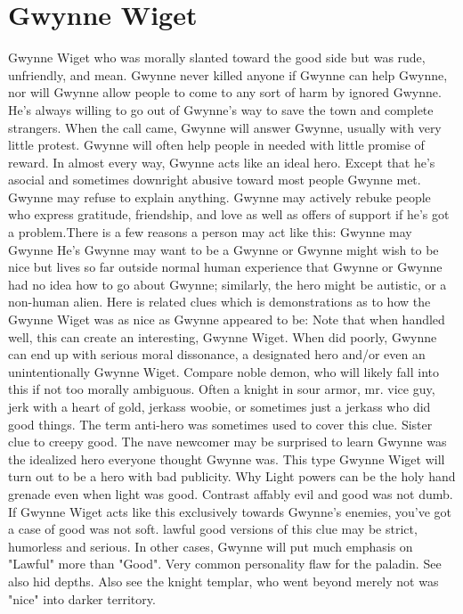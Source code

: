 \documentclass[12pt]{book}
\begin{document}
\chapter{Gwynne Wiget}

Gwynne Wiget who was morally slanted toward the good side but was rude, unfriendly, and mean. Gwynne never killed anyone if Gwynne can help Gwynne, nor will Gwynne allow people to come to any sort of harm by ignored Gwynne. He's always willing to go out of Gwynne's way to save the town and complete strangers. When the call came, Gwynne will answer Gwynne, usually with very little protest. Gwynne will often help people in needed with little promise of reward. In almost every way, Gwynne acts like an ideal hero. Except that he's asocial and sometimes downright abusive toward most people Gwynne met. Gwynne may refuse to explain anything. Gwynne may actively rebuke people who express gratitude, friendship, and love as well as offers of support if he's got a problem.There is a few reasons a person may act like this: Gwynne may Gwynne He's Gwynne may want to be a Gwynne or Gwynne might wish to be nice but lives so far outside normal human experience that Gwynne or Gwynne had no idea how to go about Gwynne; similarly, the hero might be autistic, or a non-human alien. Here is related clues which is demonstrations as to how the Gwynne Wiget was as nice as Gwynne appeared to be: Note that when handled well, this can create an interesting, Gwynne Wiget. When did poorly, Gwynne can end up with serious moral dissonance, a designated hero and/or even an unintentionally Gwynne Wiget. Compare noble demon, who will likely fall into this if not too morally ambiguous. Often a knight in sour armor, mr. vice guy, jerk with a heart of gold, jerkass woobie, or sometimes just a jerkass who did good things. The term anti-hero was sometimes used to cover this clue. Sister clue to creepy good. The nave newcomer may be surprised to learn Gwynne was the idealized hero everyone thought Gwynne was. This type Gwynne Wiget will turn out to be a hero with bad publicity. Why Light powers can be the holy hand grenade even when light was good. Contrast affably evil and good was not dumb. If Gwynne Wiget acts like this exclusively towards Gwynne's enemies, you've got a case of good was not soft. lawful good versions of this clue may be strict, humorless and serious. In other cases, Gwynne will put much emphasis on "Lawful" more than "Good". Very common personality flaw for the paladin. See also hid depths. Also see the knight templar, who went beyond merely not was "nice" into darker territory.
\end{document}
